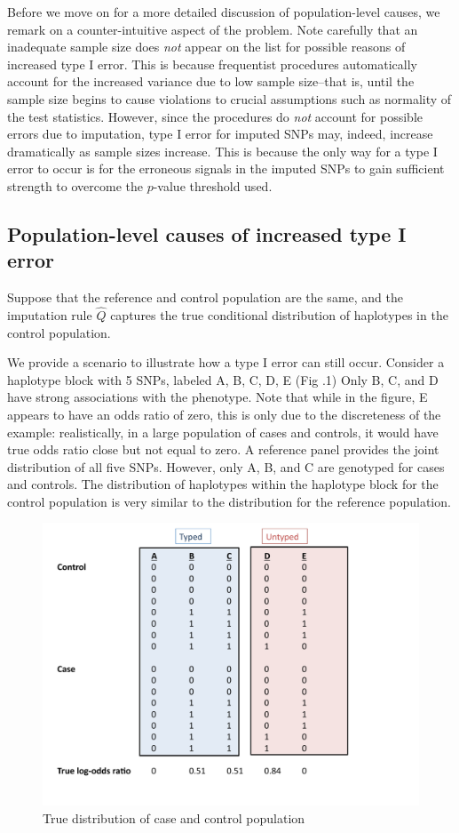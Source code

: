 \documentclass[12pt]{article}
\begin{document}
Before we move on for a more detailed discussion of population-level
causes,
we remark on a counter-intuitive aspect of the problem.
Note carefully that an inadequate sample size does \emph{not} appear
on the list for possible reasons of increased type I error.
This is because frequentist procedures automatically account
for the increased variance due to low sample size--that is,
until the sample size begins to cause violations to
crucial assumptions such as normality of the test statistics.
However, since the procedures do \emph{not} account for
possible errors due to imputation,
type I error for imputed SNPs may, indeed, increase dramatically
as sample sizes increase.
This is because the only way for a type I error to occur
is for the erroneous signals in the imputed SNPs to gain sufficient
strength
to overcome the $p$-value threshold used.

\subsection{Population-level causes of increased type I error}

Suppose that the reference and control population are the same,
and the imputation rule $\hat{Q}$ captures the true
conditional distribution of haplotypes in the control population.

We provide a scenario to illustrate how a type I error can still
occur.
Consider a haplotype block with 5 SNPs, labeled A, B, C, D, E (Fig .1)
Only B, C, and D have strong associations with the phenotype.
Note that while in the figure, E appears to have an odds ratio of
zero,
this is only due to the discreteness of the example:
realistically, in a large population of cases and controls,
it would have true odds ratio close but not equal to zero.
A reference panel provides the joint distribution of all five SNPs.
However, only A, B, and C are genotyped for cases and controls.
The distribution of haplotypes within the haplotype block
for the control population is very similar to the distribution
for the reference population.

\begin{figure}[h]
\centering
\includegraphics[scale=0.5]{impute_fig1.pdf}
\caption{True distribution of case and control population}
\end{figure}
\end{document}
